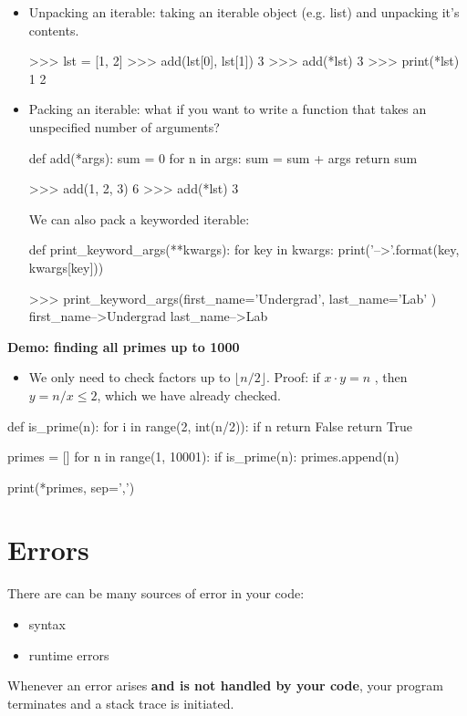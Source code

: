 \documentclass[12pt]{article}
\numberwithin{equation}{section}
\begin{document}
\begin{itemize}
    \item Unpacking an iterable: taking an iterable object (e.g. list) and unpacking it's contents.
    \begin{python}
    >>> lst = [1, 2]
    >>> add(lst[0], lst[1])
    3
    >>> add(*lst)
    3
    >>> print(*lst)
    1 2
    \end{python}
    \item Packing an iterable: what if you want to write a function that takes an unspecified number of arguments?
    \begin{python}
    def add(*args):
        sum = 0
        for n in args:
            sum = sum + args
        return sum
    
    >>> add(1, 2, 3)
    6
    >>> add(*lst)
    3
    \end{python}
	We can also pack a keyworded iterable:
\begin{python}
def print_keyword_args(**kwargs):
	for key in kwargs:
		print('{}-->{}'.format(key, kwargs[key]))
		
>>> print_keyword_args(first_name='Undergrad', last_name='Lab' )
first_name-->Undergrad
last_name-->Lab
\end{python}

\end{itemize}

\textbf{Demo: finding all primes up to 1000}
\begin{itemize}
    \item We only need to check factors up to $\lfloor n/2 \rfloor$. Proof: if $x\cdot y = n$ , then $y = n/x \leq 2$, which we have already checked.
\end{itemize}

\begin{python}
def is_prime(n):
    for i in range(2, int(n/2)):
        if n%
            return False
    return True

primes = []
for n in range(1, 10001):
    if is_prime(n):
        primes.append(n)

print(*primes, sep=',')
\end{python}

\section{Errors}
There are can be many sources of error in your code:
\begin{itemize}
    \item syntax
    \item runtime errors
\end{itemize}
Whenever an error arises \textbf{and is not handled by your code}, your program terminates and a stack trace is initiated.
\end{document}
